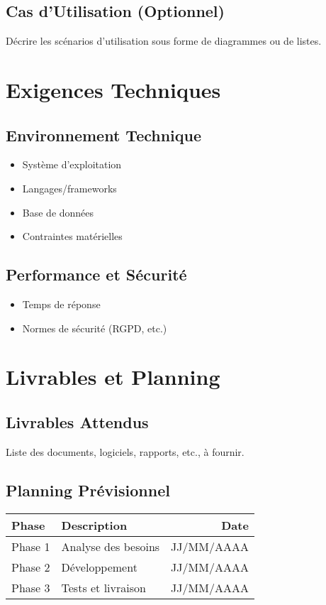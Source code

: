 \documentclass[a4paper, 12pt]{report}
\begin{document}
\section{Cas d'Utilisation (Optionnel)}
Décrire les scénarios d'utilisation sous forme de diagrammes ou de listes.

\chapter{Exigences Techniques}
\section{Environnement Technique}
\begin{itemize}
    \item Système d'exploitation
    \item Langages/frameworks
    \item Base de données
    \item Contraintes matérielles
\end{itemize}

\section{Performance et Sécurité}
\begin{itemize}
    \item Temps de réponse
    \item Normes de sécurité (RGPD, etc.)
\end{itemize}

\chapter{Livrables et Planning}
\section{Livrables Attendus}
Liste des documents, logiciels, rapports, etc., à fournir.

\section{Planning Prévisionnel}
\begin{tabularx}{\textwidth}{|l|X|r|}
    \hline
    \textbf{Phase} & \textbf{Description} & \textbf{Date} \\ \hline
    Phase 1 & Analyse des besoins & JJ/MM/AAAA \\ \hline
    Phase 2 & Développement & JJ/MM/AAAA \\ \hline
    Phase 3 & Tests et livraison & JJ/MM/AAAA \\ \hline
\end{tabularx}
\end{document}
